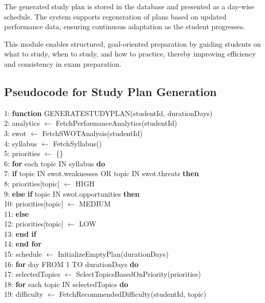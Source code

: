 \begin{sloppypar}
The generated study plan is stored in the database and presented as a day-wise schedule. The system supports regeneration of plans based on updated performance data, ensuring continuous adaptation as the student progresses.

This module enables structured, goal-oriented preparation by guiding students on what to study, when to study, and how to practice, thereby improving efficiency and consistency in exam preparation.

\subsection{Pseudocode for Study Plan Generation}

1: \textbf{function} GENERATESTUDYPLAN(studentId, durationDays)\\
2: \quad analytics $\leftarrow$ FetchPerformanceAnalytics(studentId)\\
3: \quad swot $\leftarrow$ FetchSWOTAnalysis(studentId)\\
4: \quad syllabus $\leftarrow$ FetchSyllabus()\\
5: \quad priorities $\leftarrow$ \{\}\\
6: \quad \textbf{for} each topic IN syllabus \textbf{do}\\
7: \qquad \textbf{if} topic IN swot.weaknesses OR topic IN swot.threats \textbf{then}\\
8: \qquad\quad priorities[topic] $\leftarrow$ HIGH\\
9: \qquad \textbf{else} \textbf{if} topic IN swot.opportunities \textbf{then}\\
10: \qquad\quad priorities[topic] $\leftarrow$ MEDIUM\\
11: \qquad \textbf{else}\\
12: \qquad\quad priorities[topic] $\leftarrow$ LOW\\
13: \qquad \textbf{end if}\\
14: \quad \textbf{\textbf{end for}}\\
15: \quad schedule $\leftarrow$ InitializeEmptyPlan(durationDays)\\
16: \quad \textbf{for} day FROM 1 TO durationDays \textbf{do}\\
17: \qquad selectedTopics $\leftarrow$ SelectTopicsBasedOnPriority(priorities)\\
18: \qquad \textbf{for} each topic IN selectedTopics \textbf{do}\\
19: \qquad\quad difficulty $\leftarrow$ FetchRecommendedDifficulty(studentId, topic)\\

\end{sloppypar}
